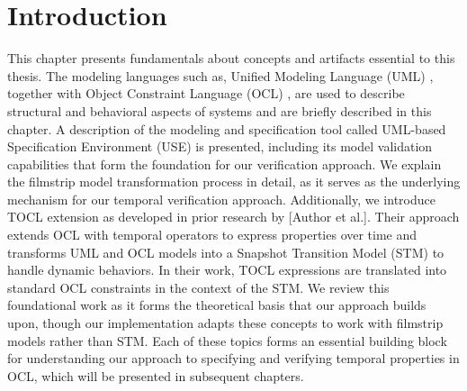 \setlength{\parindent}{1cm}

\section{Introduction}

\hspace{1cm} This chapter presents fundamentals about concepts and artifacts essential 
to this thesis. The modeling languages such as, Unified Modeling Language (UML) \cite{UML}, 
together with Object Constraint Language (OCL) \cite{OCL}, are used to describe structural and 
behavioral aspects of systems and are briefly described in this chapter. A description 
of the modeling and specification tool called UML-based Specification Environment (USE) \cite{USE}
is presented, including its model validation capabilities that form the foundation for 
our verification approach. We explain the filmstrip model transformation process in 
detail, as it serves as the underlying mechanism for our temporal verification approach.
Additionally, we introduce TOCL extension \cite{TOCL} as developed in prior research by [Author et al.]. 
Their approach extends OCL with temporal operators to express properties over time and transforms 
UML and OCL models into a Snapshot Transition Model (STM) to handle dynamic behaviors. 
In their work, TOCL expressions are translated into standard OCL constraints in the context 
of the STM. We review this foundational work as it forms the theoretical basis that our 
approach builds upon, though our implementation adapts these concepts to work with filmstrip 
models rather than STM. Each of these topics forms an essential building block for understanding 
our approach to specifying and verifying temporal properties in OCL, which will be presented in 
subsequent chapters.